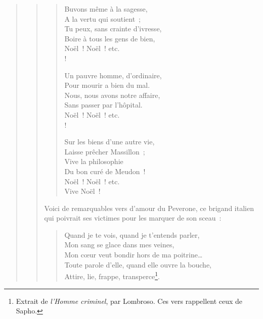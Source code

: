 \documentclass[french,twoside]{book} %
\begin{document}
\begin{verse}
\begin{verse}
\begin{verse}
Buvons même à la sagesse,\\
A la vertu qui soutient ;\\
Tu peux, sans crainte d’ivresse,\\
Boire à tous les gens de bien,\\
Noël ! Noël ! etc.\\!

Un pauvre homme, d’ordinaire,\\
Pour mourir a bien du mal.\\
Nous, nous avons notre affaire,\\
Sans passer par l’hôpital.\\
Noël ! Noël ! etc.\\!

Sur les biens d’une autre vie,\\
Laisse prêcher Massillon ;\\
Vive la philosophie\\
Du bon curé de Meudon !\\
Noël ! Noël ! etc.\\
Vive Noël !\\
\end{verse}

\noindent Voici de remarquables vers d’amour du Peverone, ce brigand italien qui poivrait ses victimes pour les marquer de son sceau :\par


\begin{verse}
Quand je te vois, quand je t’entends parler,\\
Mon sang se glace dans mes veines,\\
Mon cœur veut bondir hors de ma poitrine…\\
Toute parole d’elle, quand elle ouvre la bouche,\\
Attire, lie, frappe, transperce\footnote{Extrait de \emph{l’Homme criminel}, par Lombroso. Ces vers rappellent ceux de Sapho.}.\\
\end{verse}


\end{verse}
\end{verse}
\end{document}
